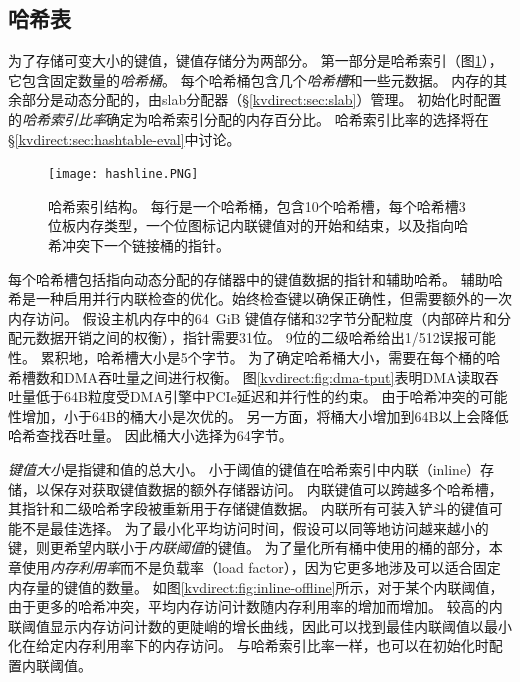 \subsection{哈希表}
\label{kvdirect:sec:hashtable}

为了存储可变大小的键值，键值存储分为两部分。 第一部分是哈希索引（图\ref {kvdirect:fig:hashtable}），它包含固定数量的\textit {哈希桶}。 每个哈希桶包含几个\textit {哈希槽}和一些元数据。 内存的其余部分是动态分配的，由slab分配器（\S \ref {kvdirect:sec:slab}）管理。
初始化时配置的\textit {哈希索引比率}确定为哈希索引分配的内存百分比。
哈希索引比率的选择将在\S \ref {kvdirect:sec:hashtable-eval}中讨论。


\begin{figure}[htbp]
	\centering
	\texttt{[image: hashline.PNG]}
	\caption{哈希索引结构。 每行是一个哈希桶，包含10个哈希槽，每个哈希槽3位板内存类型，一个位图标记内联键值对的开始和结束，以及指向哈希冲突下一个链接桶的指针。}
	\label{kvdirect:fig:hashtable}
\end{figure}



每个哈希槽包括指向动态分配的存储器中的键值数据的指针和辅助哈希。
辅助哈希是一种启用并行内联检查的优化。始终检查键以确保正确性，但需要额外的一次内存访问。
假设主机内存中的64~GiB 键值存储和32字节分配粒度（内部碎片和分配元数据开销之间的权衡），指针需要31位。
9位的二级哈希给出1/512误报可能性。
累积地，哈希槽大小是5个字节。
为了确定哈希桶大小，需要在每个桶的哈希槽数和DMA吞吐量之间进行权衡。
图\ref {kvdirect:fig:dma-tput}表明DMA读取吞吐量低于64B粒度受DMA引擎中PCIe延迟和并行性的约束。
由于哈希冲突的可能性增加，小于64B的桶大小是次优的。
另一方面，将桶大小增加到64B以上会降低哈希查找吞吐量。
因此桶大小选择为64字节。

\textit {键值大小}是指键和值的总大小。
小于阈值的键值在哈希索引中内联（inline）存储，以保存对获取键值数据的额外存储器访问。
内联键值可以跨越多个哈希槽，其指针和二级哈希字段被重新用于存储键值数据。
内联所有可装入铲斗的键值可能不是最佳选择。
为了最小化平均访问时间，假设可以同等地访问越来越小的键，则更希望内联小于\textit {内联阈值}的键值。
为了量化所有桶中使用的桶的部分，本章使用\textit {内存利用率}而不是负载率（load factor），因为它更多地涉及可以适合固定内存量的键值的数量。
如图\ref {kvdirect:fig:inline-offline}所示，对于某个内联阈值，由于更多的哈希冲突，平均内存访问计数随内存利用率的增加而增加。
较高的内联阈值显示内存访问计数的更陡峭的增长曲线，因此可以找到最佳内联阈值以最小化在给定内存利用率下的内存访问。
与哈希索引比率一样，也可以在初始化时配置内联阈值。


